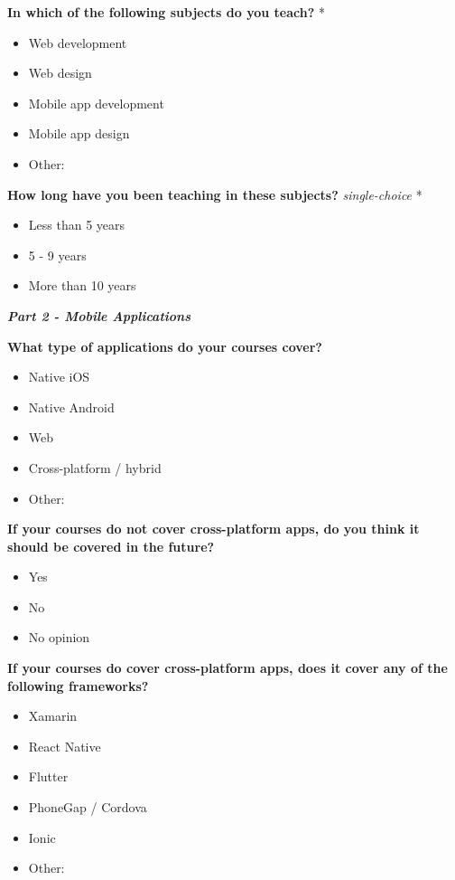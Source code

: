 \documentclass[a4paper,12pt]{article}
\begin{document}
\textbf{In which of the following subjects do you teach?} *
\begin{itemize}
    \item Web development
    \item Web design
    \item Mobile app development
    \item Mobile app design
    \item Other:
\end{itemize}

\textbf{How long have you been teaching in these subjects?} \textit{single-choice} *
\begin{itemize}
    \item Less than 5 years
    \item 5 - 9 years
    \item More than 10 years
\end{itemize}

\quad

\quad

\textbf{\textit{Part 2 - Mobile Applications}}

\textbf{What type of applications do your courses cover?}
\begin{itemize}
    \item Native iOS
    \item Native Android
    \item Web
    \item Cross-platform / hybrid
    \item Other:
\end{itemize}

\textbf{If your courses do not cover cross-platform apps, do you think it should be covered in the future?}
\begin{itemize}
    \item Yes
    \item No
    \item No opinion
\end{itemize}

\textbf{If your courses do cover cross-platform apps, does it cover any of the following frameworks?}
\begin{itemize}
    \item Xamarin
    \item React Native
    \item Flutter
    \item PhoneGap / Cordova
    \item Ionic
    \item Other:
\end{itemize}
\end{document}
